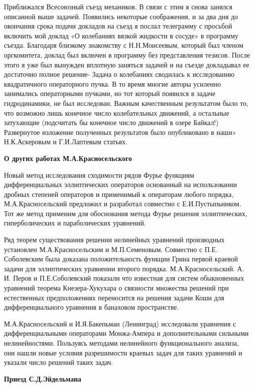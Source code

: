 Приближался Всесоюзный съезд механиков. В связи с этим я снова занялся описанной выше задачей. Появились некоторые соображения, и за два дня до окончания срока подачи докладов на съезд я послал телеграмму с просьбой включить мой доклад «О колебаниях вязкой жидкости в сосуде» в программу съезда. Благодаря близкому знакомству с Н.Н.Моисеевым, который был членом оргкомитета, доклад был включен в программу без представления тезисов. После этого я уже был вынужден вплотную заняться задачей и на съезде докладывал ее достаточно полное решение- Задача о колебаниях сводилась к исследованию квадратичного операторного пучка. В то время многие авторы усиленно занимались операторными пучками, но тот который появился в задаче гидродинамики, не был исследован. Важным качественным результатом было то, что возможно лишь конечное число колебательных движений, а остальные затухающие (подсчитать бы конечное число движений в озере Байкал!) Развернутое изложение полученных результатов было опубликовано в наши» Н.К.Аскеровым и Г.И.Лаптевым статьях.

{\bf О других работах М.А.Красносельского}

Новый метод исследования сходимости рядов Фурье функциям дифференциальных эллиптических операторов основанный на  использовании дробных степеней операторов и применимый к операторам любого порядка, М.А.Красносельский предложил и разработал совместно с Е.И.Пустыпьником.  Тот же метод применим для обоснования метода Фурье
решения эллиптических, гиперболических и параболических уравнений.

Ряд теорем существования решении нелинейных уравнений производных установлен М.А.Красносельским и М.П.Семеновым. Совместно с П.Е. Соболевским  была доказана положительность функции Грина первой краевой задачи для эллиптических уравнении второго порядка.
М.А.Красносельский. А. И. Перов и П.Е.Соболевский показали что известная для систем обыкновенных уравнений теорема Кнезера-Хукухара о связности множества решений при естественных предположениях переносится на решения задачи Коши для дифференциального уравнения в банаховом пространстве.

М.А.Красносельский и И.Я.Бакепьман (Ленинград) исследовали уравнения с дифференциальными операторами Монжа-Ампера и дополнительными сильными нелинейностями. Пользуясь методами нелинейного функционального анализа, они нашли новые условия разрешимости краевых задач для таких уравнений и указали число решений таких задач.

{\bf Приезд С.Д.Эйдельмана}


